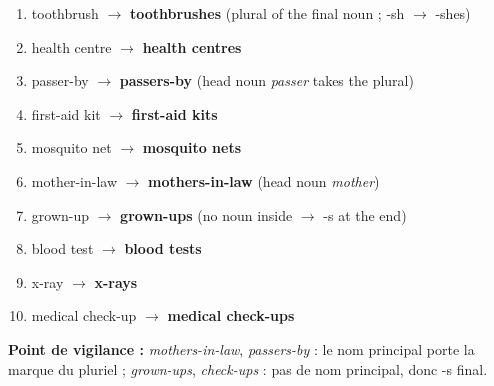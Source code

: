\documentclass[11pt]{article}
\begin{document}
\begin{corrige}
\begin{enumerate}
    \item toothbrush $\rightarrow$ \textbf{toothbrushes} (plural of the final noun ; -sh $\rightarrow$ -shes)
    \item health centre $\rightarrow$ \textbf{health centres}
    \item passer-by $\rightarrow$ \textbf{passers-by} (head noun \emph{passer} takes the plural)
    \item first-aid kit $\rightarrow$ \textbf{first-aid kits}
    \item mosquito net $\rightarrow$ \textbf{mosquito nets}
    \item mother-in-law $\rightarrow$ \textbf{mothers-in-law} (head noun \emph{mother})
    \item grown-up $\rightarrow$ \textbf{grown-ups} (no noun inside $\rightarrow$ -s at the end)
    \item blood test $\rightarrow$ \textbf{blood tests}
    \item x-ray $\rightarrow$ \textbf{x-rays}
    \item medical check-up $\rightarrow$ \textbf{medical check-ups}
\end{enumerate}
\textbf{Point de vigilance :} \emph{mothers-in-law}, \emph{passers-by} : le nom principal porte la marque du pluriel ; \emph{grown-ups}, \emph{check-ups} : pas de nom principal, donc -s final.
\end{corrige}
\end{document}
